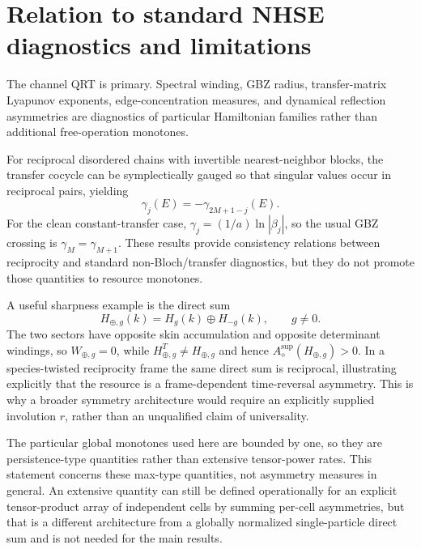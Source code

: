 \documentclass[reprint,amsmath,amssymb,aps,nofootinbib]{revtex4-2}
\begin{document}
\section{Relation to standard NHSE diagnostics and limitations}
\label{sec:limitations}

The channel QRT is primary. Spectral winding, GBZ radius, transfer-matrix Lyapunov exponents,
edge-concentration measures, and dynamical reflection asymmetries are diagnostics of particular
Hamiltonian families rather than additional free-operation monotones.

For reciprocal disordered chains with invertible nearest-neighbor blocks, the transfer cocycle can
be symplectically gauged so that singular values occur in reciprocal pairs, yielding
\begin{equation}
\gamma_j(E)=-\gamma_{2M+1-j}(E).
\end{equation}
For the clean constant-transfer case, $\gamma_j=(1/a)\ln|\beta_j|$, so the usual GBZ crossing is
$\gamma_M=\gamma_{M+1}$. These results provide consistency relations between reciprocity and
standard non-Bloch/transfer diagnostics, but they do not promote those quantities to resource
monotones.

A useful sharpness example is the direct sum
\begin{equation}
H_{\oplus,g}(k)=H_g(k)\oplus H_{-g}(k),\qquad g\ne0.
\end{equation}
The two sectors have opposite skin accumulation and opposite determinant windings, so
$W_{\oplus,g}=0$, while $H_{\oplus,g}^T\ne H_{\oplus,g}$ and hence
$A_\diamond^{\sup}(H_{\oplus,g})>0$. In a species-twisted reciprocity frame the same direct sum is
reciprocal, illustrating explicitly that the resource is a frame-dependent time-reversal
asymmetry. This is why a broader symmetry architecture would require an explicitly supplied
involution $r$, rather than an unqualified claim of universality.

The particular global monotones used here are bounded by one, so they are persistence-type quantities rather
than extensive tensor-power rates. This statement concerns these max-type quantities, not asymmetry measures in general. An extensive quantity can still be defined operationally for an
explicit tensor-product array of independent cells by summing per-cell asymmetries, but that is a
different architecture from a globally normalized single-particle direct sum and is not needed for
the main results.
\end{document}

